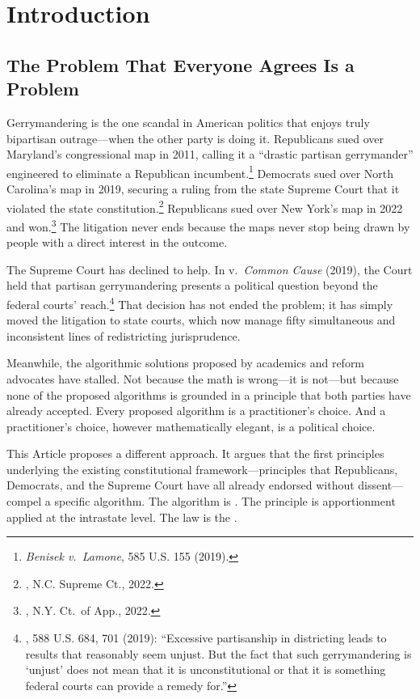 \section{Introduction}
\label{sec:introduction}

\subsection{The Problem That Everyone Agrees Is a Problem}

Gerrymandering is the one scandal in American politics that enjoys truly
bipartisan outrage---when the other party is doing it.
Republicans sued over Maryland's congressional map in 2011, calling it a
``drastic partisan gerrymander'' engineered to eliminate a Republican
incumbent.\footnote{%
  \textit{Benisek v.\ Lamone}, 585 U.S. 155 (2019).
}
Democrats sued over North Carolina's map in 2019, securing a ruling from
the state Supreme Court that it violated the state constitution.\footnote{%
  \harper{}, N.C. Supreme Ct., 2022.
}
Republicans sued over New York's map in 2022 and won.\footnote{%
  \harkenrider{}, N.Y. Ct.\ of App., 2022.
}
The litigation never ends because the maps never stop being drawn by people
with a direct interest in the outcome.

The Supreme Court has declined to help.
In \rucho{} v.\ \textit{Common Cause} (2019), the Court held that partisan
gerrymandering presents a political question beyond the federal courts'
reach.\footnote{%
  \rucho{}, 588 U.S. 684, 701 (2019): ``Excessive partisanship in
  districting leads to results that reasonably seem unjust.
  But the fact that such gerrymandering is `unjust' does not mean that it is
  unconstitutional or that it is something federal courts can provide a remedy
  for.''
}
That decision has not ended the problem; it has simply moved the litigation
to state courts, which now manage fifty simultaneous and inconsistent lines
of redistricting jurisprudence.

Meanwhile, the algorithmic solutions proposed by academics and reform advocates
have stalled.
Not because the math is wrong---it is not---but because none of the proposed
algorithms is grounded in a principle that both parties have already accepted.
Every proposed algorithm is a practitioner's choice.
And a practitioner's choice, however mathematically elegant, is a political choice.

This Article proposes a different approach.
It argues that the first principles underlying the existing constitutional
framework---principles that Republicans, Democrats, and the Supreme Court have
all already endorsed without dissent---compel a specific algorithm.
The algorithm is \ar{}.
The principle is \hh{} apportionment applied at the intrastate level.
The law is the \dia{}.

